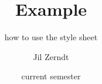 \documentclass[a4paper, fontsize = 8pt, landscape]{scrartcl}
\title{Example}
\subtitle{how to use the style sheet}
\author{Jil Zerndt}
\date{current semester}
\begin{document}
\begin{multicols}{2}
	\thispagestyle{TitlePageStyle}
	\maketitleinfo
	\sffamily
	
    \raggedcolumns
	\pagebreak
	
	\raggedcolumns
\end{multicols}
\end{document}
